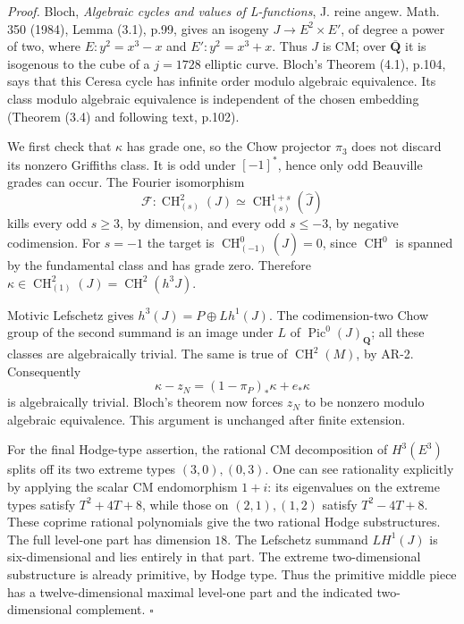\documentclass[11pt,a4paper]{article}
\begin{document}
\emph{Proof.} Bloch, \emph{Algebraic cycles and values of L-functions},
J. reine angew. Math. 350 (1984), Lemma (3.1), p.99, gives an isogeny
\(J\to E^2\times E'\), of degree a power of two, where \(E:y^2=x^3-x\)
and \(E':y^2=x^3+x\). Thus \(J\) is CM; over \(\overline{\mathbf Q}\) it
is isogenous to the cube of a \(j=1728\) elliptic curve. Bloch's Theorem
(4.1), p.104, says that this Ceresa cycle has infinite order modulo
algebraic equivalence. Its class modulo algebraic equivalence is
independent of the chosen embedding (Theorem (3.4) and following text,
p.102).

We first check that \(\kappa\) has grade one, so the Chow projector
\(\pi_3\) does not discard its nonzero Griffiths class. It is odd under
\([-1]^*\), hence only odd Beauville grades can occur. The Fourier
isomorphism \[
\mathcal F:\operatorname{CH}^2_{(s)}(J)
 \simeq\operatorname{CH}^{1+s}_{(s)}(\widehat J)
\] kills every odd \(s\ge3\), by dimension, and every odd \(s\le-3\), by
negative codimension. For \(s=-1\) the target is
\(\operatorname{CH}^0_{(-1)}(\widehat J)=0\), since
\(\operatorname{CH}^0\) is spanned by the fundamental class and has
grade zero. Therefore
\(\kappa\in\operatorname{CH}^2_{(1)}(J)=\operatorname{CH}^2(h^3J)\).

Motivic Lefschetz gives \(h^3(J)=P\oplus Lh^1(J)\). The codimension-two
Chow group of the second summand is an image under \(L\) of
\(\operatorname{Pic}^0(J)_{\mathbf Q}\); all these classes are
algebraically trivial. The same is true of \(\operatorname{CH}^2(M)\),
by AR-2. Consequently \[
\kappa-z_N=(1-\pi_P)_*\kappa+e_*\kappa
\] is algebraically trivial. Bloch's theorem now forces \(z_N\) to be
nonzero modulo algebraic equivalence. This argument is unchanged after
finite extension.

For the final Hodge-type assertion, the rational CM decomposition of
\(H^3(E^3)\) splits off its two extreme types \((3,0),(0,3)\). One can
see rationality explicitly by applying the scalar CM endomorphism
\(1+i\): its eigenvalues on the extreme types satisfy \(T^2+4T+8\),
while those on \((2,1),(1,2)\) satisfy \(T^2-4T+8\). These coprime
rational polynomials give the two rational Hodge substructures. The full
level-one part has dimension \(18\). The Lefschetz summand \(LH^1(J)\)
is six-dimensional and lies entirely in that part. The extreme
two-dimensional substructure is already primitive, by Hodge type. Thus
the primitive middle piece has a twelve-dimensional maximal level-one
part and the indicated two-dimensional complement. \(\square\)
\end{document}
